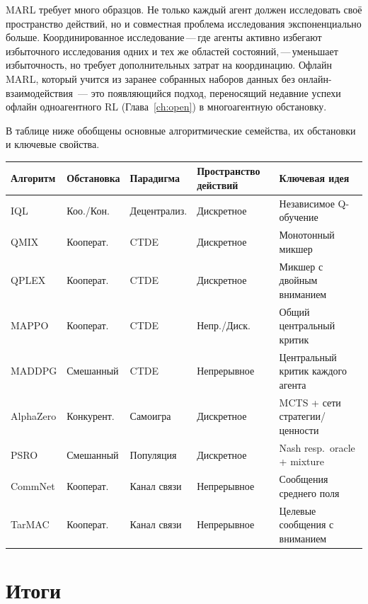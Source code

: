 MARL требует много образцов. Не только каждый агент должен исследовать своё
пространство действий, но и совместная проблема исследования экспоненциально
больше. Координированное исследование\,---\,где агенты активно
избегают избыточного исследования одних и тех же областей состояний,\,---\,уменьшает
избыточность, но требует дополнительных затрат на координацию. Офлайн
MARL, который учится из заранее собранных наборов данных
без онлайн-взаимодействия~--- это появляющийся подход, переносящий
недавние успехи офлайн одноагентного RL
(Глава~\ref{ch:open}) в многоагентную обстановку.

В таблице ниже обобщены основные алгоритмические семейства,
их обстановки и ключевые свойства.

\begin{center}
\footnotesize
\begin{tabular}{@{}p{1.5cm}p{2cm}p{2.1cm}p{2.1cm}p{3.9cm}@{}}
\toprule
\textbf{Алгоритм} & \textbf{Обстановка} & \textbf{Парадигма} & \textbf{Пространство действий} & \textbf{Ключевая идея} \\
\midrule
IQL & Коо./Кон. & Децентрализ. & Дискретное & Независимое Q-обучение \\
QMIX & Кооперат. & CTDE & Дискретное & Монотонный микшер \\
QPLEX & Кооперат. & CTDE & Дискретное & Микшер с двойным вниманием \\
MAPPO & Кооперат. & CTDE & Непр./Диск. & Общий центральный критик \\
MADDPG & Смешанный & CTDE & Непрерывное & Центральный критик каждого агента \\
AlphaZero & Конкурент. & Самоигра & Дискретное & MCTS + сети стратегии/ценности \\
PSRO & Смешанный & Популяция & Дискретное & Nash resp.\ oracle + mixture \\
CommNet & Кооперат. & Канал связи & Непрерывное & Сообщения среднего поля \\
TarMAC & Кооперат. & Канал связи & Непрерывное & Целевые сообщения с вниманием \\
\bottomrule
\end{tabular}
\end{center}

\section{Итоги}
\label{sec:marl-summary}

